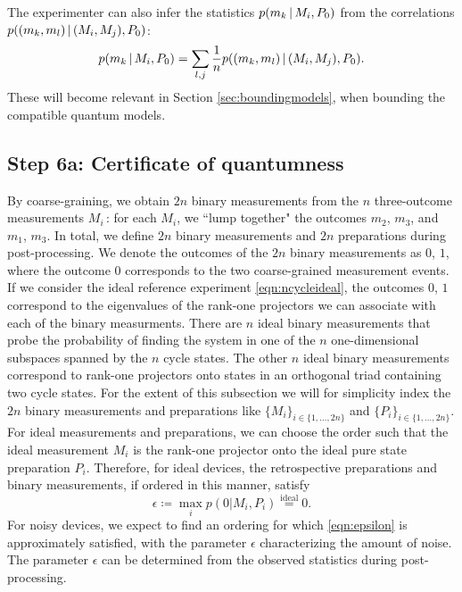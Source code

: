 The experimenter can also infer the statistics $p(m_k\thinspace\vert\thinspace M_i, P_0)$ from the correlations $p((m_k,m_l)\thinspace\vert\thinspace(M_i,M_j),P_0)$:
\begin{equation*}
p(m_k \thinspace\vert\thinspace M_i, P_0)=\sum_{l,j}\frac{1}{n}p((m_k,m_l)\thinspace\vert\thinspace (M_i,M_j),P_0).
\end{equation*}
These will become relevant in Section \ref{sec:boundingmodels}, when bounding the compatible quantum models.
\subsection{Step 6a: Certificate of quantumness}
\label{sec:certifyquant}
By coarse-graining, we obtain $2n$ binary measurements from the $n$ three-outcome measurements $M_i$\,: for each $M_i$, we ``lump together" the outcomes $m_2$, $m_3$, and $m_1$, $m_3$. In total, we define $2n$ binary measurements and $2n$ preparations during post-processing. We denote the outcomes of the $2n$ binary measurements as $0$, $1$, where the outcome $0$ corresponds to the two coarse-grained measurement events. If we consider the ideal reference experiment \ref{eqn:ncycleideal}, the outcomes $0$, $1$ correspond to the eigenvalues of the rank-one projectors we can associate with each of the binary measurments. There are $n$ ideal binary measurements that probe the probability of finding the system in one of the $n$ one-dimensional subspaces spanned by the $n$ cycle states. The other $n$ ideal binary measurements correspond to rank-one projectors onto states in an orthogonal triad containing two cycle states. For the extent of this subsection we will for simplicity index the $2n$ binary measurements and preparations like $\{M_i\}_{i\in\{1,\dots,2n\}}$ and $\{P_i\}_{i\in\{1,\dots,2n\}}$. For ideal measurements and preparations, we can choose the order such that the ideal measurement $M_i$ is the rank-one projector onto the ideal pure state preparation $P_i$. Therefore, for ideal devices, the retrospective preparations and binary measurements, if ordered in this manner, satisfy \begin{equation}
\label{eqn:epsilon}
\epsilon \coloneqq \max_i p(0\vert M_i, P_i)\stackrel{\text{ideal}}{=}0.
\end{equation} 
For noisy devices, we expect to find an ordering for which \ref{eqn:epsilon} is approximately satisfied, with the parameter $\epsilon$ characterizing the amount of noise. The parameter $\epsilon$ can be determined from the observed statistics during post-processing.

